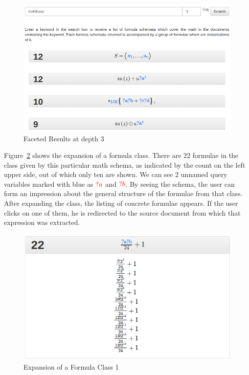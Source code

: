 \documentclass[a4paper,oneside]{article}
\def\red#1{\textcolor{red}{#1}}
\begin{document}
\begin{figure}[ht]\centering
    \includegraphics[width=12.1cm]{img/schemataGroup.png}
    \caption{Faceted Results at depth 3}\label{fig:schemata_group}
\end{figure}
\FloatBarrier

Figure~\ref{fig:schema_instantiation} shows the expansion of a formula class.
There are $22$ formulae in the class given by this particular math schema, as
indicated by the count on the left upper side, out of which only ten are shown.
We can see $2$ unnamed query variables marked with blue as $\red{?a}$ and
$\red{?b}$. By seeing the schema, the user can form an impression about the
general structure of the formulae from that class. After expanding the class,
the listing of concrete formulae appears. If the user clicks on one of them, he
is redirected to the source document from which that expression was extracted.

\begin{figure}[ht]\centering
    \includegraphics[width=12.1cm]{img/schemaInstGood.png}
    \caption{Expansion of a Formula Class 1}\label{fig:schema_instantiation}
\end{figure}
\FloatBarrier
\end{document}
